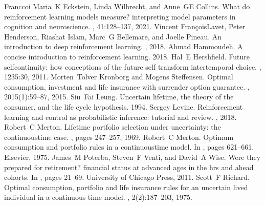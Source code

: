 \documentclass[letterpaper,10pt,english]{jupyterBook}
\begin{document}
\begin{sphinxthebibliography}{Franccoi}
\sphinxAtStartPar
Maria K Eckstein, Linda Wilbrecht, and Anne GE Collins. What do reinforcement learning models measure? interpreting model parameters in cognition and neuroscience. , 41:128–137, 2021.
\sphinxAtStartPar
Vincent François\sphinxhyphen{}Lavet, Peter Henderson, Riashat Islam, Marc G Bellemare, and Joelle Pineau. An introduction to deep reinforcement learning. , 2018.
\sphinxAtStartPar
Ahmad Hammoudeh. A concise introduction to reinforcement learning. 2018.
\sphinxAtStartPar
Hal E Hershfield. Future self\sphinxhyphen{}continuity: how conceptions of the future self transform intertemporal choice. , 1235:30, 2011.
\sphinxAtStartPar
Morten Tolver Kronborg and Mogens Steffensen. Optimal consumption, investment and life insurance with surrender option guarantee. , 2015(1):59–87, 2015.
\sphinxAtStartPar
Siu Fai Leung. Uncertain lifetime, the theory of the consumer, and the life cycle hypothesis. 1994.
\sphinxAtStartPar
Sergey Levine. Reinforcement learning and control as probabilistic inference: tutorial and review. , 2018.
\sphinxAtStartPar
Robert C Merton. Lifetime portfolio selection under uncertainty: the continuous\sphinxhyphen{}time case. , pages 247–257, 1969.
\sphinxAtStartPar
Robert C Merton. Optimum consumption and portfolio rules in a continuous\sphinxhyphen{}time model. In , pages 621–661. Elsevier, 1975.
\sphinxAtStartPar
James M Poterba, Steven F Venti, and David A Wise. Were they prepared for retirement? financial status at advanced ages in the hrs and ahead cohorts. In , pages 21–69. University of Chicago Press, 2011.
\sphinxAtStartPar
Scott F Richard. Optimal consumption, portfolio and life insurance rules for an uncertain lived individual in a continuous time model. , 2(2):187–203, 1975.

\end{sphinxthebibliography}
\end{document}

